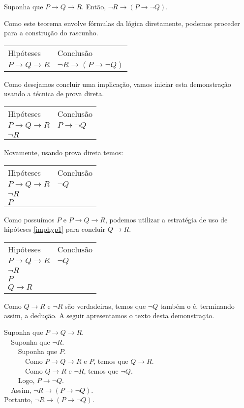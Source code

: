 \begin{Example}
\begin{flushleft}
Suponha que $P \to Q \to R$. Então, $\neg R \to (P \to \neg Q)$.
\end{flushleft}
Como este teorema envolve fórmulas da lógica diretamente, podemos
proceder para a construção do rascunho.
\begin{flushleft}
\begin{tabular}{ll}
Hipóteses & Conclusão \\
$P \to Q \to R$ & $\neg R \to (P \to \neg Q)$\\
\end{tabular}
\end{flushleft}
Como desejamos concluir uma implicação, vamos iniciar esta
demonstração usando a técnica de prova direta.
\begin{flushleft}
\begin{tabular}{ll}
Hipóteses & Conclusão \\
$P \to Q \to R$ & $ P \to \neg Q$\\
$\neg R$ & \\
\end{tabular}
\end{flushleft}
Novamente, usando prova direta temos:
\begin{flushleft}
\begin{tabular}{ll}
Hipóteses & Conclusão \\
$P \to Q \to R$ & $ \neg Q$\\
$\neg R$ & \\
$P$ & \\
\end{tabular}
\end{flushleft}
Como possuímos $P$ e $P\to Q\to R$, podemos utilizar a estratégia de
uso de hipóteses \ref{imphyp1} para concluir $Q\to R$.
\begin{flushleft}
\begin{tabular}{ll}
Hipóteses & Conclusão \\
$P \to Q \to R$ & $ \neg Q$\\
$\neg R$ & \\
$P$ & \\
$Q\to R$ &
\end{tabular}
\end{flushleft}
Como $Q\to R$ e  $\neg R$ são verdadeiras, temos que $\neg Q$ também o
é, terminando assim, a dedução.
A seguir apresentamos o texto desta demonstração.
\begin{flushleft}
Suponha que $P\to Q \to R$.\\
\verb|  |Suponha que $\neg R$.\\
\verb|    |Suponha que $P$.\\
\verb|      |Como $P \to Q \to R$ e $P$, temos que $Q\to R$.\\
\verb|      |Como $Q\to R$ e $\neg R$, temos que $\neg Q$.\\
\verb|    |Logo, $P\to \neg Q$.\\
\verb|  |Assim, $\neg R\to (P \to \neg Q)$.\\
Portanto, $\neg R \to (P \to \neg Q)$.
\end{flushleft}
\end{Example}

